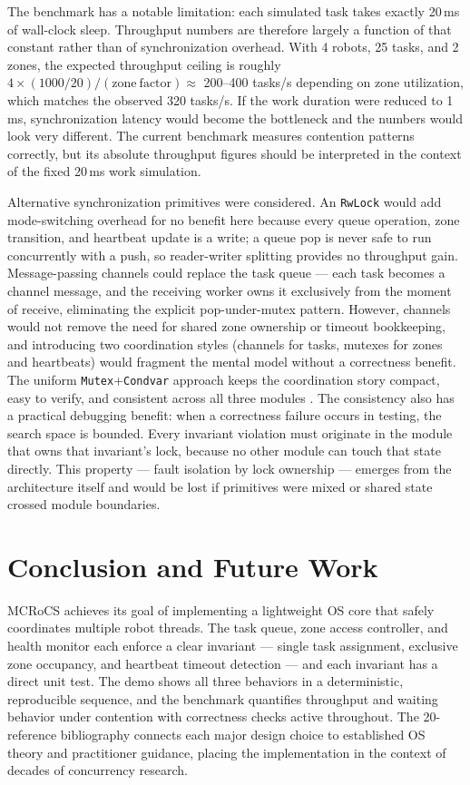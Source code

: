 \documentclass[11pt]{article}
\begin{document}
The benchmark has a notable limitation: each simulated task takes exactly 20\,ms of wall-clock sleep. Throughput numbers are therefore largely a function of that constant rather than of synchronization overhead. With 4 robots, 25 tasks, and 2 zones, the expected throughput ceiling is roughly $4 \times (1000/20) / (\mathrm{zone\ factor}) \approx$ 200--400 tasks/s depending on zone utilization, which matches the observed 320 tasks/s. If the work duration were reduced to 1\,ms, synchronization latency would become the bottleneck and the numbers would look very different. The current benchmark measures contention patterns correctly, but its absolute throughput figures should be interpreted in the context of the fixed 20\,ms work simulation.

Alternative synchronization primitives were considered. An \texttt{RwLock} would add mode-switching overhead for no benefit here because every queue operation, zone transition, and heartbeat update is a write; a queue pop is never safe to run concurrently with a push, so reader-writer splitting provides no throughput gain. Message-passing channels could replace the task queue --- each task becomes a channel message, and the receiving worker owns it exclusively from the moment of receive, eliminating the explicit pop-under-mutex pattern. However, channels would not remove the need for shared zone ownership or timeout bookkeeping, and introducing two coordination styles (channels for tasks, mutexes for zones and heartbeats) would fragment the mental model without a correctness benefit. The uniform \texttt{Mutex}+\texttt{Condvar} approach keeps the coordination story compact, easy to verify, and consistent across all three modules \citep{rustmutex,rustcondvar,herlihy2020}. The consistency also has a practical debugging benefit: when a correctness failure occurs in testing, the search space is bounded. Every invariant violation must originate in the module that owns that invariant's lock, because no other module can touch that state directly. This property --- fault isolation by lock ownership --- emerges from the architecture itself and would be lost if primitives were mixed or shared state crossed module boundaries.

\section{Conclusion and Future Work}
MCRoCS achieves its goal of implementing a lightweight OS core that safely coordinates multiple robot threads. The task queue, zone access controller, and health monitor each enforce a clear invariant --- single task assignment, exclusive zone occupancy, and heartbeat timeout detection --- and each invariant has a direct unit test. The demo shows all three behaviors in a deterministic, reproducible sequence, and the benchmark quantifies throughput and waiting behavior under contention with correctness checks active throughout. The 20-reference bibliography connects each major design choice to established OS theory and practitioner guidance, placing the implementation in the context of decades of concurrency research.
\end{document}
